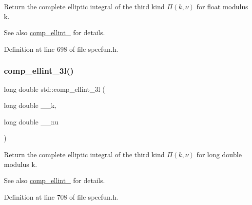 Return the complete elliptic integral of the third kind $ \Pi(k,\nu) $ for {\ttfamily float} modulus {\ttfamily k}. 

\begin{DoxySeeAlso}{See also}
\hyperlink{group__mathsf__std_ga80419d323d3231870bd588525e818974}{comp\+\_\+ellint\+\_} for details. 
\end{DoxySeeAlso}


Definition at line 698 of file specfun.\+h.

\mbox{\label{group__mathsf__std_ga1ca081fee102cd0d4d6b091285e495e5}} 
\subsubsection{\texorpdfstring{comp\+\_\+ellint\+\_\+3l()}{comp\_ellint\_3l()}}
{\footnotesize\ttfamily long double std\+::comp\+\_\+ellint\+\_\+3l (\begin{DoxyParamCaption}\item[{long double}]{\+\_\+\+\_\+k,  }\item[{long double}]{\+\_\+\+\_\+nu }\end{DoxyParamCaption})\hspace{0.3cm}{\ttfamily [inline]}}



Return the complete elliptic integral of the third kind $ \Pi(k,\nu) $ for {\ttfamily long double} modulus {\ttfamily k}. 

\begin{DoxySeeAlso}{See also}
\hyperlink{group__mathsf__std_ga80419d323d3231870bd588525e818974}{comp\+\_\+ellint\+\_} for details. 
\end{DoxySeeAlso}


Definition at line 708 of file specfun.\+h.

\mbox{\label{group__mathsf__std_ga29504b6008798072b0b8d6ea5a50ec60}} 
